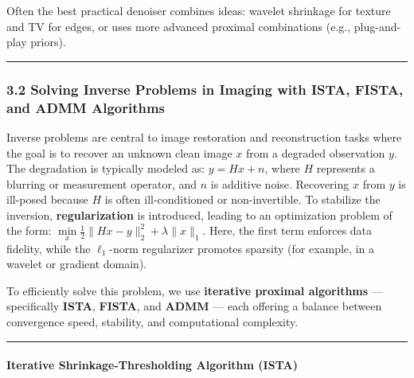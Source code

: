 \documentclass[11pt]{article}
\begin{document}
Often the best practical denoiser combines ideas: wavelet shrinkage for
texture and TV for edges, or uses more advanced proximal combinations
(e.g., plug-and-play priors).

\begin{center}\rule{0.5\linewidth}{0.5pt}\end{center}

\hypertarget{solving-inverse-problems-in-imaging-with-ista-fista-and-admm-algorithms}{%
\subsubsection{\texorpdfstring{\textbf{3.2 Solving Inverse Problems in
Imaging with ISTA, FISTA, and ADMM
Algorithms}}{3.2 Solving Inverse Problems in Imaging with ISTA, FISTA, and ADMM Algorithms}}\label{solving-inverse-problems-in-imaging-with-ista-fista-and-admm-algorithms}}

Inverse problems are central to image restoration and reconstruction
tasks where the goal is to recover an unknown clean image \(x\) from a
degraded observation \(y\). The degradation is typically modeled as:
\(y = Hx + n\), where \(H\) represents a blurring or measurement
operator, and \(n\) is additive noise. Recovering \(x\) from \(y\) is
ill-posed because \(H\) is often ill-conditioned or non-invertible. To
stabilize the inversion, \textbf{regularization} is introduced, leading
to an optimization problem of the form:
\(\underset{x}{\min} \frac{1}{2} \|Hx - y\|_2^2 + \lambda \|x\|_1\).
Here, the first term enforces data fidelity, while the \(\ell_1\)-norm
regularizer promotes sparsity (for example, in a wavelet or gradient
domain).

To efficiently solve this problem, we use \textbf{iterative proximal
algorithms} --- specifically \textbf{ISTA}, \textbf{FISTA}, and
\textbf{ADMM} --- each offering a balance between convergence speed,
stability, and computational complexity.

\begin{center}\rule{0.5\linewidth}{0.5pt}\end{center}

\hypertarget{iterative-shrinkage-thresholding-algorithm-ista}{%
\paragraph{\texorpdfstring{\textbf{Iterative Shrinkage-Thresholding
Algorithm
(ISTA)}}{Iterative Shrinkage-Thresholding Algorithm (ISTA)}}\label{iterative-shrinkage-thresholding-algorithm-ista}}
\end{document}
